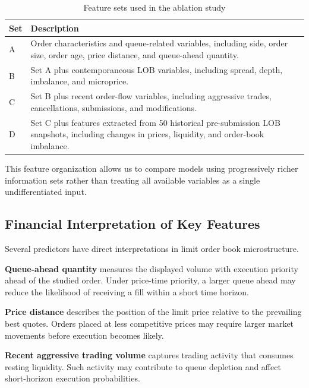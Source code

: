 \documentclass[11pt,a4paper]{article}
\begin{document}
\begin{table}[htbp]
	\centering
	\caption{Feature sets used in the ablation study}
	\label{tab:feature_sets}
	\begin{tabularx}{\textwidth}{lX}
		\toprule
		Set & Description \\
		\midrule
		A & Order characteristics and queue-related variables,
		including side, order size, order age, price distance,
		and queue-ahead quantity. \\
		
		B & Set A plus contemporaneous LOB variables,
		including spread, depth, imbalance, and microprice. \\
		
		C & Set B plus recent order-flow variables,
		including aggressive trades, cancellations,
		submissions, and modifications. \\
		
		D & Set C plus features extracted from
		50 historical pre-submission LOB snapshots,
		including changes in prices, liquidity,
		and order-book imbalance. \\
		\bottomrule
	\end{tabularx}
\end{table}

This feature organization allows us to compare models
using progressively richer information sets rather
than treating all available variables as a single
undifferentiated input.

\subsection{Financial Interpretation of Key Features}

Several predictors have direct interpretations in
limit order book microstructure.

\textbf{Queue-ahead quantity} measures the displayed
volume with execution priority ahead of the studied
order. Under price-time priority, a larger queue ahead
may reduce the likelihood of receiving a fill within
a short time horizon.

\textbf{Price distance} describes the position of
the limit price relative to the prevailing best quotes.
Orders placed at less competitive prices may require
larger market movements before execution becomes likely.

\textbf{Recent aggressive trading volume} captures
trading activity that consumes resting liquidity.
Such activity may contribute to queue depletion
and affect short-horizon execution probabilities.
\end{document}
